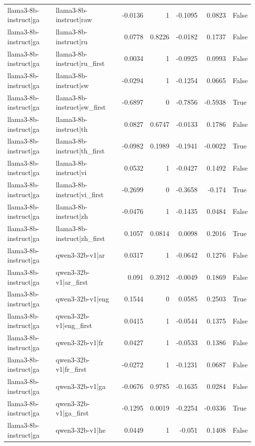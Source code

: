 \begin{table}
\begin{tabular}{l l r r r r l}
llama3-8b-instruct|ga & llama3-8b-instruct|raw & -0.0136 & 1 & -0.1095 & 0.0823 & False \\
llama3-8b-instruct|ga & llama3-8b-instruct|ru & 0.0778 & 0.8226 & -0.0182 & 0.1737 & False \\
llama3-8b-instruct|ga & llama3-8b-instruct|ru_first & 0.0034 & 1 & -0.0925 & 0.0993 & False \\
llama3-8b-instruct|ga & llama3-8b-instruct|sw & -0.0294 & 1 & -0.1254 & 0.0665 & False \\
llama3-8b-instruct|ga & llama3-8b-instruct|sw_first & -0.6897 & 0 & -0.7856 & -0.5938 & True \\
llama3-8b-instruct|ga & llama3-8b-instruct|th & 0.0827 & 0.6747 & -0.0133 & 0.1786 & False \\
llama3-8b-instruct|ga & llama3-8b-instruct|th_first & -0.0982 & 0.1989 & -0.1941 & -0.0022 & True \\
llama3-8b-instruct|ga & llama3-8b-instruct|vi & 0.0532 & 1 & -0.0427 & 0.1492 & False \\
llama3-8b-instruct|ga & llama3-8b-instruct|vi_first & -0.2699 & 0 & -0.3658 & -0.174 & True \\
llama3-8b-instruct|ga & llama3-8b-instruct|zh & -0.0476 & 1 & -0.1435 & 0.0484 & False \\
llama3-8b-instruct|ga & llama3-8b-instruct|zh_first & 0.1057 & 0.0814 & 0.0098 & 0.2016 & True \\
llama3-8b-instruct|ga & qwen3-32b-v1|ar & 0.0317 & 1 & -0.0642 & 0.1276 & False \\
llama3-8b-instruct|ga & qwen3-32b-v1|ar_first & 0.091 & 0.3912 & -0.0049 & 0.1869 & False \\
llama3-8b-instruct|ga & qwen3-32b-v1|eng & 0.1544 & 0 & 0.0585 & 0.2503 & True \\
llama3-8b-instruct|ga & qwen3-32b-v1|eng_first & 0.0415 & 1 & -0.0544 & 0.1375 & False \\
llama3-8b-instruct|ga & qwen3-32b-v1|fr & 0.0427 & 1 & -0.0533 & 0.1386 & False \\
llama3-8b-instruct|ga & qwen3-32b-v1|fr_first & -0.0272 & 1 & -0.1231 & 0.0687 & False \\
llama3-8b-instruct|ga & qwen3-32b-v1|ga & -0.0676 & 0.9785 & -0.1635 & 0.0284 & False \\
llama3-8b-instruct|ga & qwen3-32b-v1|ga_first & -0.1295 & 0.0019 & -0.2254 & -0.0336 & True \\
llama3-8b-instruct|ga & qwen3-32b-v1|he & 0.0449 & 1 & -0.051 & 0.1408 & False \\

\end{tabular}
\end{table}
